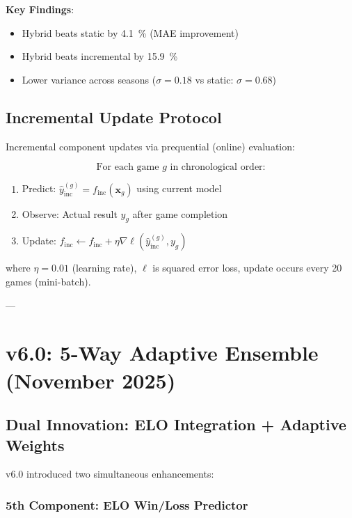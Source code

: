 \textbf{Key Findings}:
\begin{itemize}
\item Hybrid beats static by \SI{4.1}{\percent} (MAE improvement)
\item Hybrid beats incremental by \SI{15.9}{\percent}
\item Lower variance across seasons ($\sigma = 0.18$ vs static: $\sigma = 0.68$)
\end{itemize}

\subsection{Incremental Update Protocol}

Incremental component updates via prequential (online) evaluation:

\begin{equation}
\text{For each game } g \text{ in chronological order:}
\end{equation}
\begin{enumerate}
\item Predict: $\hat{y}_{\text{inc}}^{(g)} = f_{\text{inc}}(\mathbf{x}_g)$ using current model
\item Observe: Actual result $y_g$ after game completion
\item Update: $f_{\text{inc}} \leftarrow f_{\text{inc}} + \eta \nabla \ell(\hat{y}_{\text{inc}}^{(g)}, y_g)$
\end{enumerate}

where $\eta = 0.01$ (learning rate), $\ell$ is squared error loss, update occurs every 20 games (mini-batch).

---

\section{v6.0: 5-Way Adaptive Ensemble (November 2025)}

\subsection{Dual Innovation: ELO Integration + Adaptive Weights}

v6.0 introduced two simultaneous enhancements:

\subsubsection{5th Component: ELO Win/Loss Predictor}

